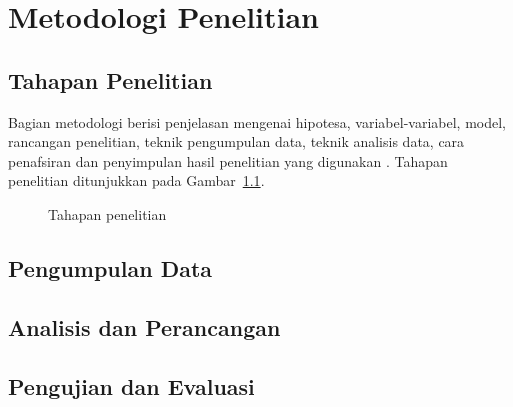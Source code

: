 \chapter{Metodologi Penelitian}
\label{bab:metodologi}

\section{Tahapan Penelitian}
\label{sec:tahapan}

Bagian metodologi berisi penjelasan mengenai hipotesa, variabel-variabel, model, rancangan penelitian, teknik pengumpulan data, teknik analisis data, cara penafsiran dan penyimpulan hasil penelitian yang digunakan \parencite{sugiyono2019metode}. Tahapan penelitian ditunjukkan pada Gambar~\ref{fig:tahapan}.

\begin{figure}[htbp]
\centering
{}
\caption{Tahapan penelitian}
\label{fig:tahapan}
\end{figure}

\section{Pengumpulan Data}
\label{sec:data}


\section{Analisis dan Perancangan}
\label{sec:rancangan}


\section{Pengujian dan Evaluasi}
\label{sec:pengujian}


